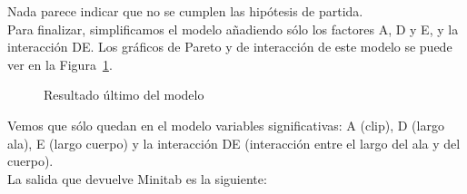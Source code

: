 \documentclass[12pt,a4paper,twoside,openright,titlepage,final]{article}
\begin{document}
Nada parece indicar que no se cumplen las hipótesis de partida.\\

Para finalizar, simplificamos el modelo añadiendo sólo los factores A, D y E, y la interacción DE. Los gráficos de Pareto y de interacción de este modelo se puede ver en la Figura~\ref{fig:resultado_experimento_fraccional_4}.\\

\begin{figure}[htbp!]
	\centering
	\caption{Resultado último del modelo} \label{fig:resultado_experimento_fraccional_4}
\end{figure}

Vemos que sólo quedan en el modelo variables significativas: A (clip), D (largo ala), E (largo cuerpo) y la interacción DE (interacción entre el largo del ala y del cuerpo).\\

La salida que devuelve Minitab es la siguiente:
\end{document}
